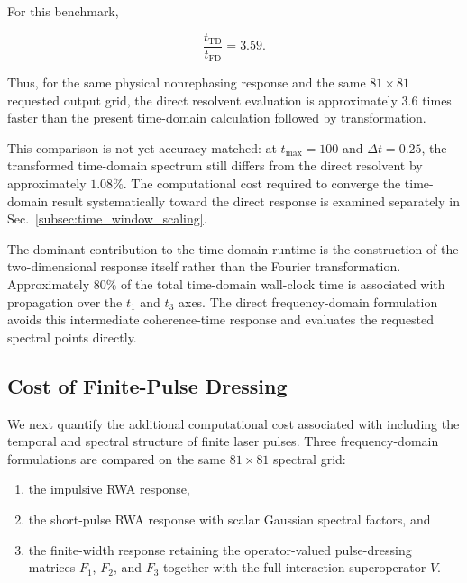 \documentclass[11pt]{article}
\begin{document}
For this benchmark,

\begin{equation}
\boxed{
\frac{t_{\mathrm{TD}}}{t_{\mathrm{FD}}}
=
3.59.
}
\end{equation}

Thus, for the same physical nonrephasing response and the same
$81\times81$ requested output grid, the direct resolvent evaluation is
approximately $3.6$ times faster than the present time-domain
calculation followed by transformation.

This comparison is not yet accuracy matched: at
$t_{\max}=100$ and $\Delta t=0.25$, the transformed time-domain
spectrum still differs from the direct resolvent by approximately
$1.08\%$. The computational cost required to converge the
time-domain result systematically toward the direct response is
examined separately in Sec.~\ref{subsec:time_window_scaling}.

The dominant contribution to the time-domain runtime is the
construction of the two-dimensional response itself rather than the
Fourier transformation.  Approximately $80\%$ of the total
time-domain wall-clock time is associated with propagation over the
$t_1$ and $t_3$ axes.  The direct frequency-domain formulation avoids
this intermediate coherence-time response and evaluates the requested
spectral points directly.



\subsection{Cost of Finite-Pulse Dressing}
\label{subsec:finite_pulse_cost}

We next quantify the additional computational cost associated with
including the temporal and spectral structure of finite laser pulses.
Three frequency-domain formulations are compared on the same
$81\times81$ spectral grid:

\begin{enumerate}
    \item the impulsive RWA response,
    \item the short-pulse RWA response with scalar Gaussian spectral
    factors, and
    \item the finite-width response retaining the operator-valued
    pulse-dressing matrices $F_1$, $F_2$, and $F_3$ together with the
    full interaction superoperator $V$.
\end{enumerate}
\end{document}
